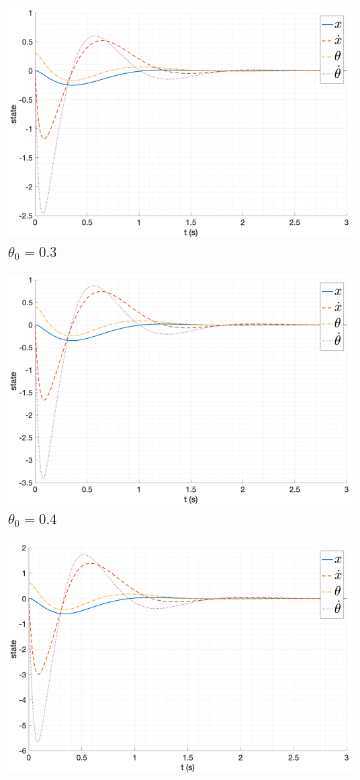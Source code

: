 \begin{figure}[ht!]
    \centering
    \begin{subfigure}[b]{0.45\textwidth}
        \includegraphics[width=\textwidth]{media/plots/nonmodal_control/state_1.png}
        \caption{$\theta_0 = 0.3$}
    \end{subfigure}
    \begin{subfigure}[b]{0.45\textwidth}
        \includegraphics[width=\textwidth]{media/plots/nonmodal_control/state_2.png}
        \caption{$\theta_0 = 0.4$}
    \end{subfigure}
    \begin{subfigure}[b]{0.45\textwidth}
        \includegraphics[width=\textwidth]{media/plots/nonmodal_control/state_3.png}

\end{subfigure}
\end{figure}
